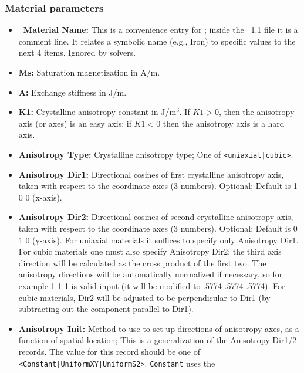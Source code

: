 \subsubsection{Material parameters}
\begin{itemize}
\item {\bf\lb\ Material Name:} This is a convenience entry for
   ; inside the \MIF~1.1 file it is a comment line.  It
   relates a symbolic name (e.g., Iron) to specific values to the next
   4 items.  Ignored by solvers.
\item {\bf Ms:} Saturation magnetization
   in A/m.
\item {\bf A:} Exchange stiffness in J/m.
\item {\bf K1:} Crystalline
 anisotropy
   constant in J/m${}^3$.  If $K1>0$, then the anisotropy axis (or axes)
   is an easy axis; if $K1<0$ then the anisotropy axis is a hard axis.
\item {\bf Anisotropy Type:} Crystalline anisotropy type; One of
\texttt{<uniaxial|cubic>}.
\item {\bf Anisotropy Dir1:} Directional cosines of first crystalline
   anisotropy axis, taken with respect to the coordinate axes (3
   numbers).  Optional; Default is 1 0 0 (x-axis).
\item {\bf Anisotropy Dir2:} Directional cosines of second crystalline
   anisotropy axis, taken with respect to the coordinate axes (3
   numbers).  Optional; Default is 0 1 0 (y-axis).
   \html{\\}\latex{\par}
   For uniaxial materials it suffices to specify only Anisotropy
   Dir1.  For cubic materials one must also specify Anisotropy
   Dir2; the third axis direction will be calculated as the cross
   product of the first two.  The anisotropy directions will be
   automatically normalized if necessary, so for example 1 1 1 is
   valid input (it will be modified to .5774 .5774 .5774).  For cubic
   materials, Dir2 will be adjusted to be perpendicular to Dir1 (by
   subtracting out the component parallel to Dir1).
\item {\bf Anisotropy Init:}
   Method to use to set up directions of anisotropy axes, as a function
   of spatial location; This is a generalization of the Anisotropy
   Dir1/2 records.  The value for this record should be one of
   \texttt{<Constant|UniformXY|UniformS2>}.  \texttt{Constant} uses the

\end{itemize}
